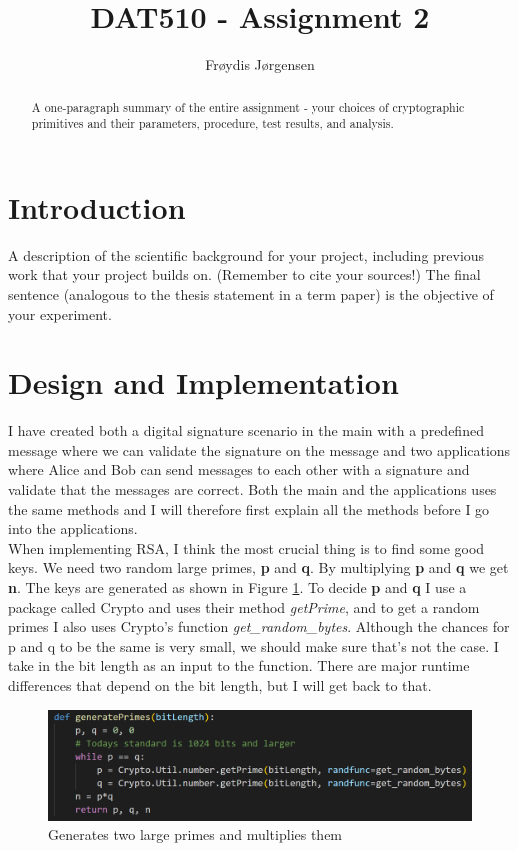 \documentclass[12pt, letterpaper]{article}
\title{DAT510 - Assignment 2}
\author{Fr\o ydis J\o rgensen}
\begin{document}
\begin{titlepage}
\maketitle
\end{titlepage}

\begin{abstract}
A one-paragraph summary of the entire assignment - your choices of cryptographic primitives and their parameters,
procedure, test results, and analysis. 
\end{abstract}

\section*{Introduction}
A description of the scientific background for your project, including previous work that your project builds on.
(Remember to cite your sources!) The final sentence (analogous to the thesis statement in a term paper) is the
objective of your experiment. 

\section*{Design and Implementation}
I have created both a digital signature scenario in the main with a predefined message where we can validate the signature on the message and two applications where Alice and Bob can send messages to each other with a signature and validate that the messages are correct. Both the main and the applications uses the same methods and I will therefore first explain all the methods before I go into the applications. \\

When implementing RSA, I think the most crucial thing is to find some good keys. We need two random large primes, \textbf{p} and \textbf{q}. By multiplying \textbf{p} and \textbf{q} we get \textbf{n}. The keys are generated as shown in Figure \ref{fig:generatePrimes}. To decide \textbf{p} and \textbf{q} I use a package called Crypto and uses their method \textit{getPrime}, and to get a random primes I also uses Crypto's function \textit{get\_random\_bytes}. Although the chances for p and q to be the same is very small, we should make sure that's not the case. I take in the bit length as an input to the function. There are major runtime differences that depend on the bit length, but I will get back to that.

\begin{figure}[H]
  \includegraphics[width=\linewidth]{code_snippets/getPrimes.PNG}
  \caption{Generates two large primes and multiplies them}
  \label{fig:generatePrimes}
\end{figure}
\end{document}
